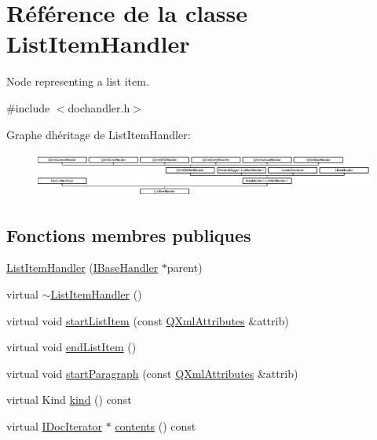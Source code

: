 \hypertarget{class_list_item_handler}{}\section{Référence de la classe List\+Item\+Handler}
\label{class_list_item_handler}


Node representing a list item.  




{\ttfamily \#include $<$dochandler.\+h$>$}

Graphe d\textquotesingle{}héritage de List\+Item\+Handler\+:\begin{figure}[H]
\begin{center}
\leavevmode
\includegraphics[height=1.467890cm]{class_list_item_handler}
\end{center}
\end{figure}
\subsection*{Fonctions membres publiques}
\begin{DoxyCompactItemize}
\item 
\hyperlink{class_list_item_handler_aa492d946bdd0000c1d1bb15d64d5a4eb}{List\+Item\+Handler} (\hyperlink{class_i_base_handler}{I\+Base\+Handler} $\ast$parent)
\item 
virtual \hyperlink{class_list_item_handler_a7ef7cddc1288e6d0bf8f950e0e76ff00}{$\sim$\+List\+Item\+Handler} ()
\item 
virtual void \hyperlink{class_list_item_handler_adbf3e261858994410a731688f9056d0d}{start\+List\+Item} (const \hyperlink{class_q_xml_attributes}{Q\+Xml\+Attributes} \&attrib)
\item 
virtual void \hyperlink{class_list_item_handler_a5ceb4a676db89d9572a4adddc2a85a7b}{end\+List\+Item} ()
\item 
virtual void \hyperlink{class_list_item_handler_a1e7a8cf13c6903589ab16f4ccc04b13a}{start\+Paragraph} (const \hyperlink{class_q_xml_attributes}{Q\+Xml\+Attributes} \&attrib)
\item 
virtual Kind \hyperlink{class_list_item_handler_a1387fe7cacd04ab658b41a8daf62237a}{kind} () const 
\item 
virtual \hyperlink{class_i_doc_iterator}{I\+Doc\+Iterator} $\ast$ \hyperlink{class_list_item_handler_aa46fa3cda532dc4104b569628a693a7f}{contents} () const 
\end{DoxyCompactItemize}
